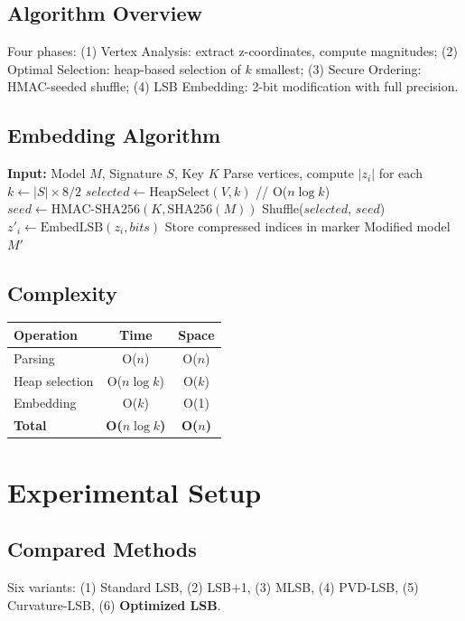 \documentclass[conference]{IEEEtran}
\begin{document}
\subsection{Algorithm Overview}
Four phases: (1) Vertex Analysis: extract z-coordinates, compute magnitudes; (2) Optimal Selection: heap-based selection of $k$ smallest; (3) Secure Ordering: HMAC-seeded shuffle; (4) LSB Embedding: 2-bit modification with full precision.

\subsection{Embedding Algorithm}
\begin{algorithmic}[1]
\STATE \textbf{Input:} Model $M$, Signature $S$, Key $K$
\STATE Parse vertices, compute $|z_i|$ for each
\STATE $k \leftarrow |S| \times 8 / 2$
\STATE $selected \leftarrow \text{HeapSelect}(V, k)$ \quad // O($n \log k$)
\STATE $seed \leftarrow \text{HMAC-SHA256}(K, \text{SHA256}(M))$
\STATE Shuffle($selected$, $seed$)
    \STATE $z'_i \leftarrow \text{EmbedLSB}(z_i, bits)$
\ENDFOR
\STATE Store compressed indices in marker
\RETURN Modified model $M'$
\end{algorithmic}

\subsection{Complexity}
\begin{table}[H]
\centering
\begin{tabular}{lcc}
\toprule
\textbf{Operation} & \textbf{Time} & \textbf{Space} \\
\midrule
Parsing & O($n$) & O($n$) \\
Heap selection & O($n \log k$) & O($k$) \\
Embedding & O($k$) & O(1) \\
\textbf{Total} & \textbf{O($n \log k$)} & \textbf{O($n$)} \\
\bottomrule
\end{tabular}
\end{table}

\section{Experimental Setup}

\subsection{Compared Methods}
Six variants: (1) Standard LSB, (2) LSB+1, (3) MLSB, (4) PVD-LSB, (5) Curvature-LSB, (6) \textbf{Optimized LSB}.
\end{document}
